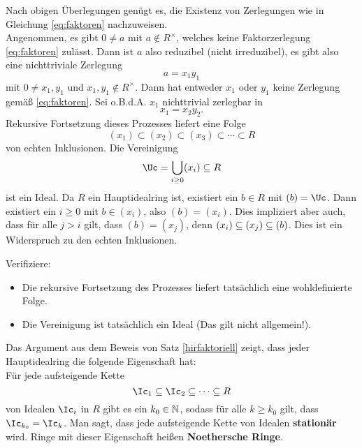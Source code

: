 \begin{beweis}
Nach obigen Überlegungen genügt es, die Existenz von Zerlegungen wie in Gleichung \ref{eq:faktoren} nachzuweisen.\\
Angenommen, es gibt $0 \neq a$ mit $a \notin R^\times$, welches keine Faktorzerlegung \ref{eq:faktoren} zulässt. Dann ist $a$ also reduzibel (nicht irreduzibel), es gibt also eine nichttriviale Zerlegung 
\begin{equation}
a = x_1y_1
\end{equation}
mit $0 \neq x_1, y_1$ und $x_1, y_1 \notin R^\times$. Dann hat entweder $x_1$ oder $y_1$ keine Zerlegung gemäß \ref{eq:faktoren}. Sei o.B.d.A. $x_1$ nichttrivial zerlegbar in 
\begin{equation}
x_1 = x_2 y_2.
\end{equation}
Rekursive Fortsetzung dieses Prozesses liefert eine Folge
\begin{equation}
(x_1) \subset (x_2) \subset (x_3) \subset \cdots \subset R
\end{equation}
von echten Inklusionen. Die Vereinigung
\begin{equation}
\Uc = \bigcup_{i \geq 0} (x_i) \sub R
\end{equation}
ist ein Ideal. Da $R$ ein Hauptidealring ist, existiert ein $b \in R$ mit $(b) = \Uc$. Dann existiert ein $i \geq 0$ mit $b \in (x_i)$, also $(b) = (x_i)$. Dies impliziert aber auch, dass für alle $j > i$ gilt, dass $(b) = (x_j)$, denn $(x_i) \subseteq (x_j) \subseteq (b)$. Dies ist ein Widerspruch zu den echten Inklusionen.
\end{beweis}
\begin{übung}
Verifiziere:
\begin{itemize}
\item Die rekursive Fortsetzung des Prozesses liefert tatsächlich eine wohldefinierte Folge.
\item Die Vereinigung ist tatsächlich ein Ideal (Das gilt nicht allgemein!).
\end{itemize}
\end{übung}
\begin{bemerkung}
Das Argument aus dem Beweis von Satz \ref{hirfaktoriell} zeigt, dass jeder Hauptidealring die folgende Eigenschaft hat:\\
Für jede aufsteigende Kette 
\begin{equation}
\Ic_1 \sub \Ic_2 \sub \cdots \sub R
\end{equation}
von Idealen $\Ic_i$ in $R$ gibt es ein $k_0 \in \mathbb{N}$, sodass für alle $k \geq k_0$ gilt, dass $\Ic_{k_0} = \Ic_k$. Man sagt, dass jede aufsteigende Kette von Idealen \textbf{stationär} wird. Ringe mit dieser Eigenschaft heißen \textbf{Noethersche Ringe}.
\end{bemerkung}
